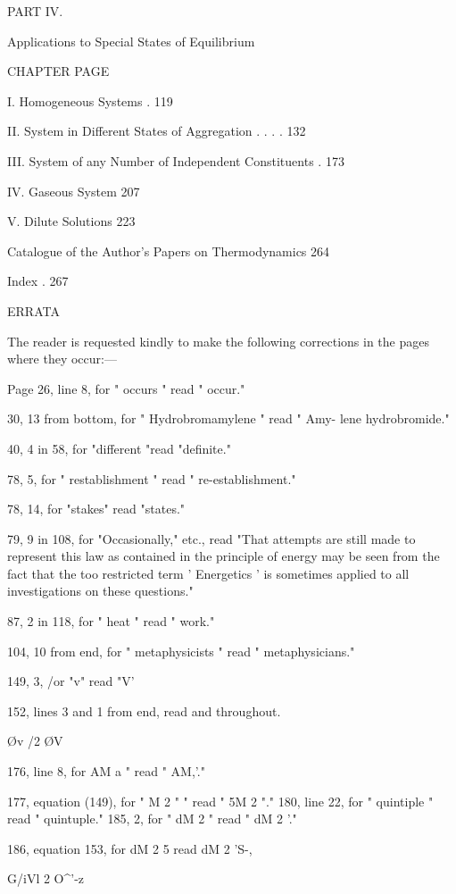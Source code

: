 \documentclass[12pt]{book}[2005/09/16]
\newcommand{\PageSep}[1]{\ignorespaces}
\begin{document}
PART IV.

Applications to Special States of Equilibrium

CHAPTER PAGE

I. Homogeneous Systems . 119

II. System in Different States of Aggregation . . . . 132

III. System of any Number of Independent Constituents . 173

IV. Gaseous System 207

V. Dilute Solutions 223

Catalogue of the Author's Papers on Thermodynamics 264

Index . 267
\PageSep{xiii}

ERRATA

The reader is requested kindly to make the following corrections in the
pages where they occur:---

Page 26, line 8, for " occurs " read " occur."

30, 13 from bottom, for " Hydrobromamylene " read " Amy-
lene hydrobromide."

40, 4 in 58, for "different "read "definite."

78, 5, for " restablishment " read " re-establishment."

78, 14, for "stakes" read "states."

79, 9 in 108, for "Occasionally," etc., read "That attempts
are still made to represent this law as contained in the
principle of energy may be seen from the fact that the
too restricted term ' Energetics ' is sometimes applied to
all investigations on these questions."

87, 2 in 118, for " heat " read " work."

104, 10 from end, for " metaphysicists " read " metaphysicians."

149, 3, /or "v" read "V'



152, lines 3 and 1 from end, read and throughout.

\O v /2 \O V

176, line 8, for AM a " read " AM,'."

177, equation (149), for " M 2 " " read " 5M 2 "."
180, line 22, for " quintiple " read " quintuple."
185, 2, for " dM 2 " read " dM 2 '."



186, equation 153, for dM 2 5 read dM 2 'S-,

G/iVl 2 O^'-z
\end{document}
